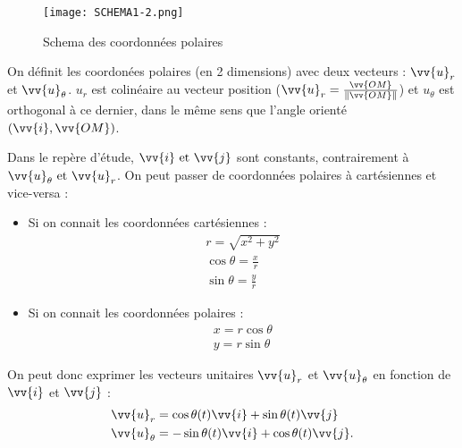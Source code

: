 \begin{figure}[!htb]
    \centering
    \texttt{[image: SCHEMA1-2.png]}
    \caption{Schema des coordonnées polaires}
    \label{fig:SCHEMA-COPOL}
\end{figure}


\begin{definition}
    On définit les coordonées polaires (en 2 dimensions) avec deux vecteurs : \(\vv{u}_{r}\) et \(\vv{u}_{\theta }\). \(u_{r}\) est colinéaire au vecteur position (\(\vv{u}_{r} = \frac{\vv{OM}}{\lVert \vv{OM} \rVert }\)) et \(u_{\theta }\) est orthogonal à ce dernier, dans le même sens que l'angle orienté \((\vv{i}, \vv{OM})\).     
\end{definition}

\begin{remark}
    Dans le repère d'étude, $\vv{i} \text{ et } \vv{j}$ sont constants, contrairement à $\vv{u}_\theta \text{ et } \vv{u}_r$.
On peut passer de coordonnées polaires à cartésiennes et vice-versa :
    \begin{itemize}
        \item Si on connait les coordonnées cartésiennes : \\ 
        \begin{eqnarray*}
            r = \sqrt{x^2 + y^2}\\ \cos\theta = \frac{x}{r}\\ \sin\theta = \frac{y}{r} 
        \end{eqnarray*}
        \item Si on connait les coordonnées polaires : \\
        \begin{eqnarray*}
            x = r \cos\theta\\
            y = r \sin\theta
        \end{eqnarray*}
    \end{itemize}

    \begin{corollary}
        On peut donc exprimer les vecteurs unitaires \(\vv{u}_{r}\) et \(\vv{u}_{\theta }\) en fonction de \(\vv{i}\) et \(\vv{j}\) : 
        \begin{eqnarray*}
            \vv{u}_r &= \cos\theta(t) \vv{i} + \sin\theta(t)\vv{j}\\
            \vv{u}_\theta &=  -\sin\theta(t)\vv{i} + \cos\theta(t)\vv{j} 
        .\end{eqnarray*}    
    \end{corollary}
\end{remark}


